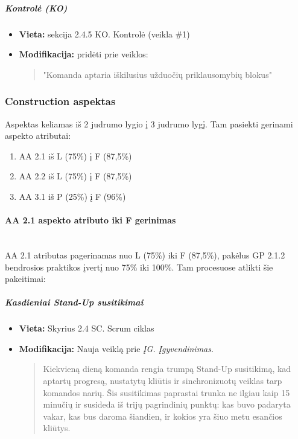 \documentclass{article}
\newcommand{\subsubsubsection}[1]{\paragraph{#1}\mbox{}\\}
\begin{document}
\subparagraph{Kontrolė (KO)}
\begin{itemize}
    \item \textbf{Vieta:} sekcija 2.4.5 KO. Kontrolė (veikla \#1)
    \item \textbf{Modifikacija:} pridėti prie veiklos:
    \begin{quote}
        "Komanda aptaria iškilusius užduočių priklausomybių blokus"
    \end{quote}
\end{itemize}

\newpage
\subsubsection{Construction aspektas}

Aspektas keliamas iš 2 judrumo lygio į 3 judrumo lygį. Tam pasiekti gerinami aspekto atributai:
\begin{enumerate}
\item AA 2.1 iš L (75\%) į F (87,5\%) 
\item AA 2.2 iš L (75\%) į F (87,5\%) 
\item AA 3.1 iš P (25\%) į F (96\%) 
\end{enumerate}

\subsubsubsection{AA 2.1 aspekto atributo iki F gerinimas}

AA 2.1 atributas pagerinamas nuo L (75\%) iki F (87,5\%), pakėlus GP 2.1.2 bendrosios praktikos įvertį nuo 75\% iki 100\%. Tam procesuose atlikti šie pakeitimai:

\subparagraph{Kasdieniai Stand-Up susitikimai}
\begin{itemize}
    \item \textbf{Vieta:} Skyrius 2.4 SC. Scrum ciklas
    \item \textbf{Modifikacija:} Nauja veiklą prie \textit{ĮG. Įgyvendinimas}.
    \begin{quote}
   Kiekvieną dieną komanda rengia trumpą Stand-Up susitikimą, kad aptartų progresą, nustatytų kliūtis ir sinchronizuotų veiklas tarp komandos narių. Šis susitikimas paprastai trunka ne ilgiau kaip 15 minučių ir susideda iš trijų pagrindinių punktų: kas buvo padaryta vakar, kas bus daroma šiandien, ir kokios yra šiuo metu esančios kliūtys.
    \end{quote}
\end{itemize}
\end{document}
